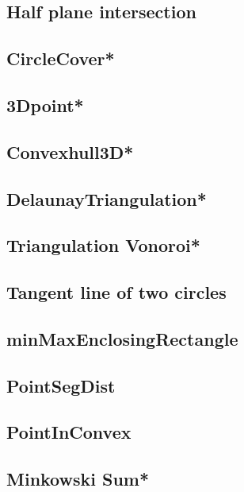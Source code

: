 \subsection{Half plane intersection}

\subsection{CircleCover*} %

\subsection{3Dpoint*} %

\subsection{Convexhull3D*} %

\subsection{DelaunayTriangulation*} %

\subsection{Triangulation Vonoroi*} %

\subsection{Tangent line of two circles}

\subsection{minMaxEnclosingRectangle}

\subsection{PointSegDist}

\subsection{PointInConvex}

\subsection{Minkowski Sum*} %

